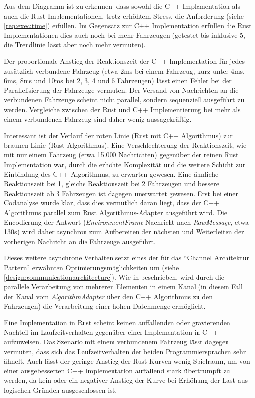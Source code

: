 Aus dem Diagramm ist zu erkennen, dass sowohl die C++ Implementation als auch die Rust Implementationen, trotz erhöhtem Stress, die Anforderung  (siehe \autoref{req:exec:time}) erfüllen.
Im Gegensatz zur C++ Implementation erfüllen die Rust Implementationen dies auch noch bei mehr Fahrzeugen (getestet bis inklusive 5, die Trendlinie lässt aber noch mehr vermuten).

Der proportionale Anstieg der Reaktionszeit der C++ Implementation für jedes zusätzlich verbundene Fahrzeug (etwa 2ms bei einem Fahrzeug, kurz unter 4ms, 6ms, 8ms und 10ms bei 2, 3, 4 und 5 Fahrzeugen) lässt einen Fehler bei der Parallelisierung der Fahrzeuge vermuten.
Der Versand von Nachrichten an die verbundenen Fahrzeuge scheint nicht parallel, sondern sequenziell ausgeführt zu werden.
Vergleiche zwischen der Rust und C++ Implementierung bei mehr als einem verbundenen Fahrzeug sind daher wenig aussagekräftig.

Interessant ist der Verlauf der roten Linie (Rust mit C++ Algorithmus) zur braunen Linie (Rust Algorithmus).
Eine Verschlechterung der Reaktionszeit, wie mit nur einem Fahrzeug (etwa 15.000 Nachrichten) gegenüber der reinen Rust Implementation war, durch die erhöhte Komplexität und die weitere Schicht zur Einbindung des C++ Algorithmus, zu erwarten gewesen.
Eine ähnliche Reaktionszeit bei 1, gleiche Reaktionszeit bei 2 Fahrzeugen und bessere Reaktionszeit ab 3 Fahrzeugen ist dagegen unerwartet gewesen.
Erst bei einer Codanalyse wurde klar, dass dies vermutlich daran liegt, dass der C++ Algorithmus parallel zum Rust Algorithmus-Adapter ausgeführt wird.
Die Encodierung der Antwort (\textit{EnvironmentFrame}-Nachricht nach \textit{RawMessage}, etwa 130\textmu s) wird daher asynchron zum Aufbereiten der nächsten und Weiterleiten der vorherigen Nachricht an die Fahrzeuge ausgeführt.

Dieses weitere asynchrone Verhalten setzt eines der für das \enquote{Channel Architektur Pattern} erwähnten Optimierungsmöglichkeiten um (siehe \autoref{design:communication:architecture}).
Wie in \cite[160]{douglass2003real} beschrieben, wird durch die parallele Verarbeitung von mehreren Elementen in einem Kanal (in diesem Fall der Kanal vom \textit{AlgorithmAdapter} über den C++ Algorithmus zu den Fahrzeugen) die Verarbeitung einer hohen Datenmenge ermöglicht.

Eine Implementation in Rust scheint keinen auffallenden oder gravierenden Nachteil im Laufzeitverhalten gegenüber einer Implementation in C++ aufzuweisen.
Das Szenario mit einem verbundenem Fahrzeug lässt dagegen vermuten, dass sich das Laufzeitverhalten der beiden Programmiersprachen sehr ähnelt.
Auch lässt der geringe Anstieg der Rust-Kurven wenig Spielraum, um von einer ausgebesserten C++ Implementation auffallend stark übertrumpft zu werden, da
kein oder ein negativer Anstieg der Kurve bei Erhöhung der Last aus logischen Gründen ausgeschlossen ist.

